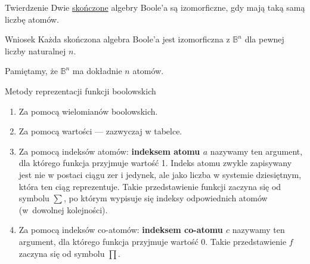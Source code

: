 \documentclass[a4paper,10pt]{beamer}
\begin{document}
\begin{frame}
	
	\begin{block}{Twierdzenie}
		Dwie \underline{skończone} algebry Boole'a są izomorficzne, gdy mają taką samą liczbę atomów.
	\end{block}

	\begin{block}{Wniosek}%
		Każda skończona algebra Boole'a jest izomorficzna z $\mathbb{B}^n$ dla pewnej liczby naturalnej $n$.
	\end{block}

	Pamiętamy, że $\mathbb{B}^n$ ma dokładnie $n$ atomów.
	
\end{frame}


\begin{frame}
	
	\begin{block}{Metody reprezentacji funkcji boolowskich}
		\begin{enumerate}
		\item Za pomocą wielomianów boolowskich.
		\item Za pomocą wartości --- zazwyczaj w tabelce.
		\item Za pomocą indeksów atomów: {\bf indeksem atomu $a$} nazywamy ten argument, dla którego funkcja przyjmuje wartość 1. Indeks atomu zwykle zapisywany jest nie w postaci ciągu zer i jedynek, ale jako liczba w systemie dziesiętnym, która ten ciąg reprezentuje. Takie przedstawienie funkcji zaczyna się od symbolu $\sum$, po którym wypisuje się indeksy odpowiednich atomów (w~dowolnej kolejności).
		\item Za pomocą indeksów co-atomów: {\bf indeksem co-atomu $c$} nazywamy ten argument, dla którego funkcja przyjmuje wartość 0. Takie przedstawienie $f$ zaczyna się od symbolu $\prod$.
		\end{enumerate}
	\end{block}
	
\end{frame}
\end{document}
